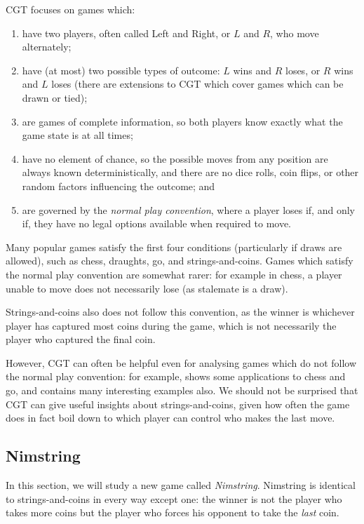 \documentclass[a4paper,twocolumn]{article}
\begin{document}
CGT focuses on games which:

\begin{enumerate}
  \item have two players, often called Left and Right, or $L$ and $R$,
    who move alternately;
  \item have (at most) two possible types of outcome: $L$ wins and $R$
    loses, or $R$ wins and $L$ loses (there are extensions to CGT
    which cover games which can be drawn or tied);
  \item are games of complete information, so both players know
    exactly what the game state is at all times;
  \item have no element of chance, so the possible moves from any
    position are always known deterministically, and there are no dice
    rolls, coin flips, or other random factors influencing the
    outcome; and
  \item are governed by the \emph{normal play convention}, where a
    player loses if, and only if, they have no legal options available
    when required to move.
\end{enumerate}

Many popular games satisfy the first four conditions (particularly if
draws are allowed), such as chess, draughts, go, and
strings-and-coins. Games which satisfy the normal play convention are
somewhat rarer: for example in chess, a player unable to move does not
necessarily lose (as stalemate is a draw).

Strings-and-coins also does not follow this convention, as the winner
is whichever player has captured most coins during the game, which is
not necessarily the player who captured the final coin.

However, CGT can often be helpful even for analysing games which do
not follow the normal play convention: for example, \cite{nochance}
shows some applications to chess and go, and \cite{wways} contains
many interesting examples also. We should not be surprised that CGT
can give useful insights about strings-and-coins, given how often the
game does in fact boil down to which player can control who makes the
last move.

\subsection{Nimstring}

In this section, we will study a new game called
\emph{Nimstring}. Nimstring is identical to strings-and-coins in every
way except one: the winner is not the player who takes more coins but
the player who forces his opponent to take the \emph{last}
coin.
\end{document}
